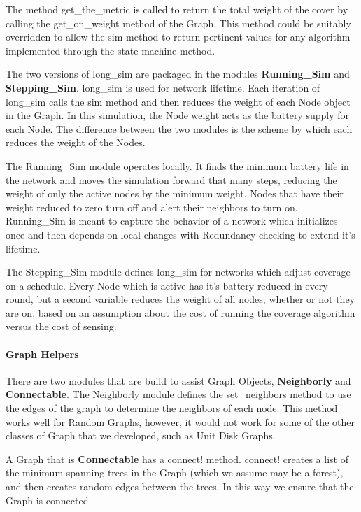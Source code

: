 The method {\ttfamily get\_the\_metric} is called to return the total weight of the cover by calling the {\ttfamily get\_on\_weight} method of the Graph. This method could be suitably overridden to allow the {\ttfamily sim} method to return pertinent values for any algorithm implemented through the state machine method.

The two versions of {\ttfamily long\_sim} are packaged in the modules {\bfseries Running\_Sim} and {\bfseries Stepping\_Sim}. {\ttfamily long\_sim} is used for network lifetime. Each iteration of {\ttfamily long\_sim} calls the {\ttfamily sim} method and then reduces the weight of each Node object in the Graph. In this simulation, the Node weight acts as the battery supply for each Node. The difference between the two modules is the scheme by which each reduces the weight of the Nodes.

The Running\_Sim module operates locally. It finds the minimum battery life in the network and moves the simulation forward that many steps, reducing the weight of only the active nodes by the minimum weight. Nodes that have their weight reduced to zero turn off and alert their neighbors to turn on. Running\_Sim is meant to capture the behavior of a network which initializes once and then depends on local changes with Redundancy checking to extend it's lifetime.

The Stepping\_Sim module defines {\ttfamily long\_sim} for networks which adjust coverage on a schedule. Every Node which is active has it's battery reduced in every round, but a second variable reduces the weight of all nodes, whether or not they are on, based on an assumption about the cost of running the coverage algorithm versus the cost of sensing.

\paragraph{Graph Helpers}

There are two modules that are build to assist Graph Objects, {\bfseries Neighborly} and {\bfseries Connectable}. The Neighborly module defines the {\ttfamily set\_neighbors} method to use the edges of the graph to determine the neighbors of each node. This method works well for Random Graphs, however, it would not work for some of the other classes of Graph that we developed, such as Unit Disk Graphs. 

A Graph that is {\bfseries Connectable} has a {\ttfamily connect!} method. {\ttfamily connect!} creates a list of the minimum spanning trees in the Graph (which we assume may be a forest), and then creates random edges between the trees. In this way we ensure that the Graph is connected.


